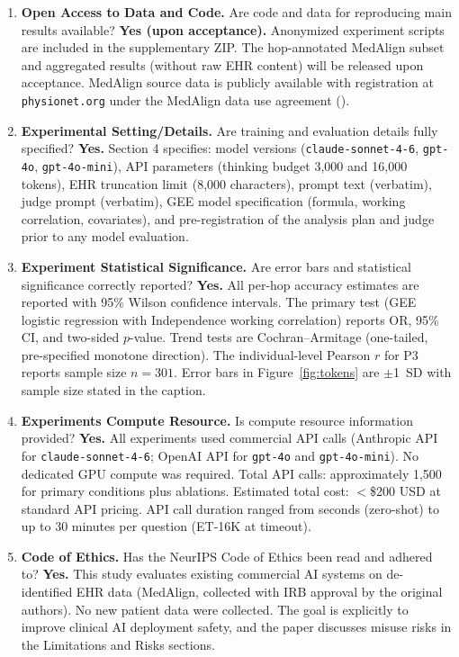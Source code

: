 \documentclass{article}
\begin{document}
\begin{enumerate}
\item \textbf{Open Access to Data and Code.}
Are code and data for reproducing main results available?
\textbf{Yes (upon acceptance).} Anonymized experiment scripts are included
in the supplementary ZIP. The hop-annotated MedAlign subset and aggregated
results (without raw EHR content) will be released upon acceptance.
MedAlign source data is publicly available with registration at
\texttt{physionet.org} under the MedAlign data use agreement
(\citep{wornow2024medalign}).

\item \textbf{Experimental Setting/Details.}
Are training and evaluation details fully specified?
\textbf{Yes.} Section 4 specifies: model versions (\texttt{claude-sonnet-4-6},
\texttt{gpt-4o}, \texttt{gpt-4o-mini}), API parameters (thinking budget
3{,}000 and 16{,}000 tokens), EHR truncation limit (8{,}000 characters),
prompt text (verbatim), judge prompt (verbatim), GEE model specification
(formula, working correlation, covariates), and pre-registration of the
analysis plan and judge prior to any model evaluation.

\item \textbf{Experiment Statistical Significance.}
Are error bars and statistical significance correctly reported?
\textbf{Yes.} All per-hop accuracy estimates are reported with 95\% Wilson
confidence intervals. The primary test (GEE logistic regression with
Independence working correlation) reports OR, 95\% CI, and two-sided
$p$-value. Trend tests are Cochran--Armitage (one-tailed, pre-specified
monotone direction). The individual-level Pearson $r$ for P3 reports sample
size $n = 301$. Error bars in Figure~\ref{fig:tokens} are $\pm$1~SD with
sample size stated in the caption.

\item \textbf{Experiments Compute Resource.}
Is compute resource information provided?
\textbf{Yes.} All experiments used commercial API calls (Anthropic API for
\texttt{claude-sonnet-4-6}; OpenAI API for \texttt{gpt-4o} and
\texttt{gpt-4o-mini}). No dedicated GPU compute was required. Total API
calls: approximately 1{,}500 for primary conditions plus ablations.
Estimated total cost: $<$\$200 USD at standard API pricing. API call
duration ranged from seconds (zero-shot) to up to 30 minutes per question
(ET-16K at timeout).

\item \textbf{Code of Ethics.}
Has the NeurIPS Code of Ethics been read and adhered to?
\textbf{Yes.} This study evaluates existing commercial AI systems on
de-identified EHR data (MedAlign, collected with IRB approval by the
original authors). No new patient data were collected. The goal is
explicitly to improve clinical AI deployment safety, and the paper
discusses misuse risks in the Limitations and Risks sections.


\end{enumerate}
\end{document}
